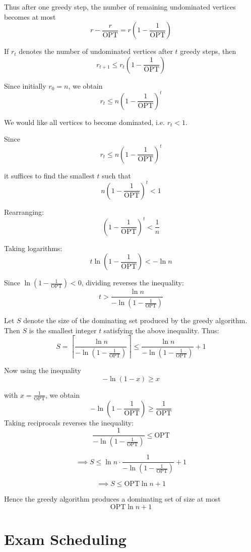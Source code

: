 \documentclass[11pt,openany]{book}
\begin{document}
Thus after one greedy step, the number of remaining undominated vertices becomes at most
\[
r-\frac{r}{\mathrm{OPT}}
=
r\left(1-\frac{1}{\mathrm{OPT}}\right)
\]

If \(r_t\) denotes the number of undominated vertices after \(t\) greedy steps, then
\[
r_{t+1}
\le
r_t\left(1-\frac1{\mathrm{OPT}}\right)
\]

Since initially \(r_0=n\), we obtain
\[
r_t
\le
n\left(1-\frac1{\mathrm{OPT}}\right)^t
\]

We would like all vertices to become dominated, i.e. \(r_t<1\).

Since
\[
r_t
\le
n\left(1-\frac1{\mathrm{OPT}}\right)^t
\]

it suffices to find the smallest \(t\) such that
\[
n\left(1-\frac1{\mathrm{OPT}}\right)^t<1
\]

Rearranging:
\[
\left(1-\frac1{\mathrm{OPT}}\right)^t<\frac1n
\]

Taking logarithms:
\[
t\ln\left(1-\frac1{\mathrm{OPT}}\right)<-\ln n
\]

Since \(\ln(1-\frac1{\mathrm{OPT}})<0\), dividing reverses the inequality:
\[
t>
\frac{\ln n}{
-\ln\left(1-\frac1{\mathrm{OPT}}\right)
}
\]

Let \(S\) denote the size of the dominating set produced by the greedy algorithm. Then \(S\) is the smallest integer \(t\) satisfying the above inequality. Thus:
\[
S=
\left\lceil
\frac{\ln n}{
-\ln\left(1-\frac{1}{\mathrm{OPT}}\right)
}
\right\rceil
\le
\frac{\ln n}{
-\ln\left(1-\frac{1}{\mathrm{OPT}}\right)
}
+1
\]

Now using the inequality
\[
-\ln(1-x)\ge x
\]

with \(x=\frac1{\mathrm{OPT}}\), we obtain
\[
-\ln\left(1-\frac1{\mathrm{OPT}}\right)
\ge
\frac1{\mathrm{OPT}}
\]
\vspace{0.4em}
Taking reciprocals reverses the inequality:
\[
\frac1{
-\ln\left(1-\frac1{\mathrm{OPT}}\right)
}
\le
\mathrm{OPT}
\]

\[
\implies
S
\le
\ln n\cdot
\frac1{
-\ln\left(1-\frac1{\mathrm{OPT}}\right)
}
+1
\]

\[
\implies
S
\le
\mathrm{OPT}\ln n+1
\]

Hence the greedy algorithm produces a dominating set of size at most
\[
\boxed{
\mathrm{OPT}\ln n+1
}
\]

\section{Exam Scheduling}
\end{document}
